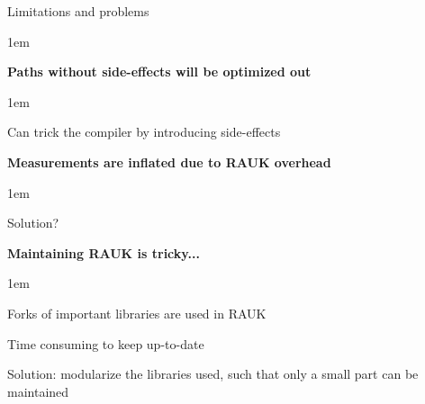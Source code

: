 \begin{frame}{Limitations and problems}
    \begin{itemize-size}{1em}
            \item \textbf{Paths without side-effects will be optimized out}
                \begin{itemize-size}{1em}
                    \item Can trick the compiler by introducing side-effects
                \end{itemize-size}
            \item \textbf{Measurements are inflated due to RAUK overhead}
                \begin{itemize-size}{1em}
                    \item Solution?
                \end{itemize-size}
            \item \textbf{Maintaining RAUK is tricky...}
                \begin{itemize-size}{1em}
                    \item Forks of important libraries are used in RAUK
                    \item Time consuming to keep up-to-date
                    \item Solution: modularize the libraries used, such
                    that only a small part can be maintained
                \end{itemize-size}
        \end{itemize-size}
\end{frame}
